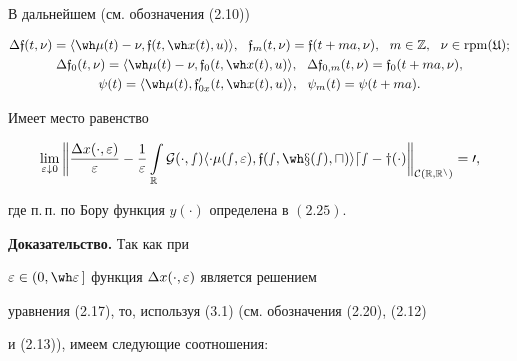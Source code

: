 В дальнейшем (см. обозначения (2.10))


\begin{gather}


\Dl\frak{f}(t,\nu)=\la\wh\mu(t)-\nu,\frak{f}(t,\wh x(t),u)\ra,


\ \ {\frak{f}}_{m}(t,\nu)={\frak{f}}(t+ma,\nu),


\ \ m\in\Bbb Z,\ \ \nu\in \rpm(\gU);\notag \\


\Dl{\frak{f}}_{0}(t,\nu)=\la\wh\mu(t)-\nu,{\frak{f}}_{0}(t,\wh x(t),u)\ra,


\ \ \Dl{\frak{f}}_{0,m}(t,\nu)={\frak{f}}_{0}(t+ma,\nu), \\


\psi(t)=\la\wh\mu(t),{\frak{f}}'_{0x}(t,\wh x(t),u)\ra,\ \ \psi_{m}(t)=


\psi(t+ma).\notag


\end{gather}





\begin{lems}


Имеет место равенство


$$


\lim_{\ve\downarrow0}\bigg\|\frac{\Dl x(\cdot,\ve)}{\ve}-


\frac{1}{\ve}\int\lt_{\R}\pG(\cdot,s)


\la\Dl\mu(s,\ve),\frak{f}(s,\wh x(s),u)\ra ds-y(\cdot)\bigg\|_{C(\R,\R^n)}=0,


$$


где п.\,п. по Бору функция $y(\cdot)$ определена в $(2.25)$.


\end{lems}





{\bf Доказательство.} Так как при


$\ve\in(0,\wh\ve\,]$ функция $\Delta x(\cdot,\varepsilon)$ является решением


уравнения (2.17), то, используя (3.1) (см. обозначения (2.20), (2.12)


и (2.13)), имеем следующие соотношения:


